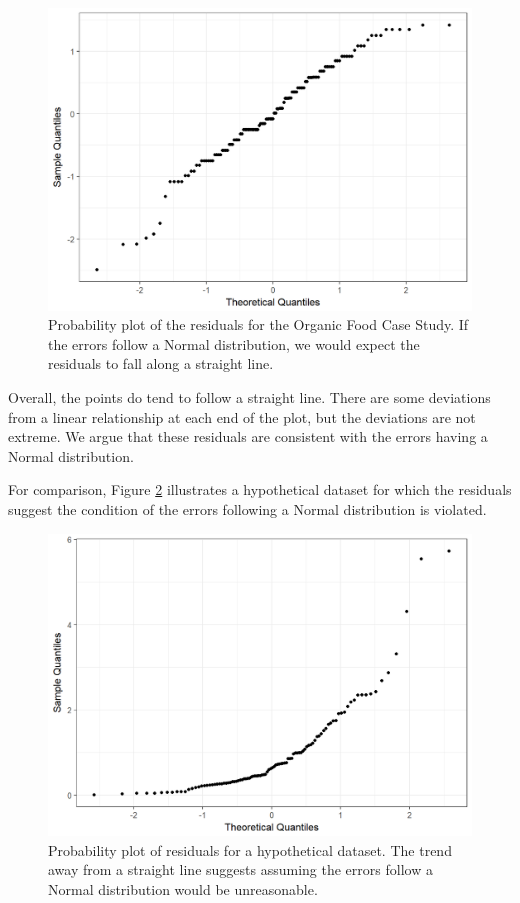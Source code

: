\documentclass[]{book}
\theoremstyle{definition}
\theoremstyle{definition}
\theoremstyle{definition}
\theoremstyle{remark}
\begin{document}
\begin{figure}

{\centering \includegraphics[width=0.8\linewidth]{./Images/anovaassessment-normal-organic-1} 

}

\caption{Probability plot of the residuals for the Organic Food Case Study.  If the errors follow a Normal distribution, we would expect the residuals to fall along a straight line.}\label{fig:anovaassessment-normal-organic}
\end{figure}

Overall, the points do tend to follow a straight line. There are some
deviations from a linear relationship at each end of the plot, but the
deviations are not extreme. We argue that these residuals are consistent
with the errors having a Normal distribution.

For comparison, Figure \ref{fig:anovaassessment-normal-bad} illustrates
a hypothetical dataset for which the residuals suggest the condition of
the errors following a Normal distribution is violated.

\begin{figure}

{\centering \includegraphics[width=0.8\linewidth]{./Images/anovaassessment-normal-bad-1} 

}

\caption{Probability plot of residuals for a hypothetical dataset.  The trend away from a straight line suggests assuming the errors follow a Normal distribution would be unreasonable.}\label{fig:anovaassessment-normal-bad}
\end{figure}
\end{document}
